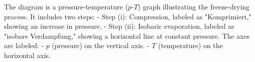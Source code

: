The diagram is a pressure-temperature (\(p\)-\(T\)) graph illustrating the freeze-drying process. It includes two steps:  
- Step (i): Compression, labeled as "Komprimiert," showing an increase in pressure.  
- Step (ii): Isobaric evaporation, labeled as "isobare Verdampfung," showing a horizontal line at constant pressure.  
The axes are labeled:  
- \(p\) (pressure) on the vertical axis.  
- \(T\) (temperature) on the horizontal axis.